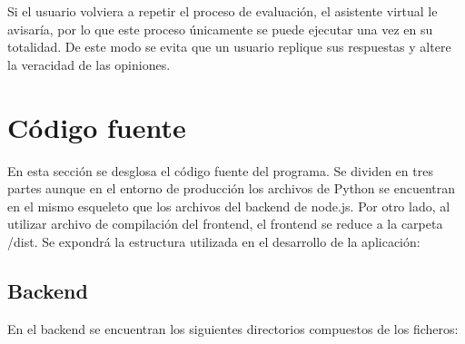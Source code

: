 Si el usuario volviera a repetir el proceso de evaluación, el asistente virtual le avisaría, por lo que este proceso únicamente se puede ejecutar una vez en su totalidad. De este modo se evita que un usuario replique sus respuestas y altere la veracidad de las opiniones.


\section{Código fuente}

En esta sección se desglosa el código fuente del programa. Se dividen en tres partes aunque en el entorno de producción los archivos de Python se encuentran en el mismo esqueleto que los archivos del backend de node.js. Por otro lado, al utilizar archivo de compilación del frontend, el frontend se reduce a la carpeta /dist. Se expondrá la estructura utilizada en el desarrollo de la aplicación:

\subsection{Backend}

En el backend se encuentran los siguientes directorios compuestos de los ficheros:

